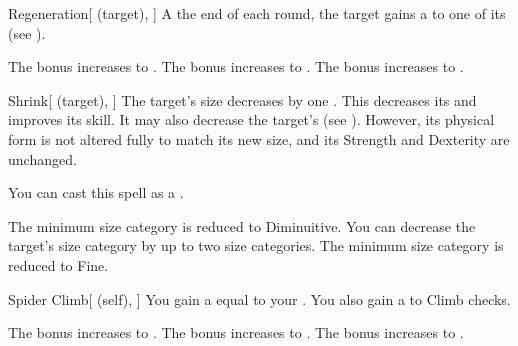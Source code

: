 \lowercase{\hypertarget{spell:Regeneration}{}}\label{spell:Regeneration}
\begin{attuneability}[Rank 1]{\hypertarget{spell:Regeneration}{Regeneration}}[ (target), ]
A the end of each round, the target gains a   to one of its  (see ).

\rankline
{} The bonus increases to .
 The bonus increases to .
 The bonus increases to .
\end{attuneability}
\vspace{0.25em}



\lowercase{\hypertarget{spell:Shrink}{}}\label{spell:Shrink}
\begin{attuneability}[Rank 1]{\hypertarget{spell:Shrink}{Shrink}}[ (target), ]
The target's size decreases by one .
This decreases its  and improves its  skill.
It may also decrease the target's  (see ).
However, its physical form is not altered fully to match its new size, and its Strength and Dexterity are unchanged.

You can cast this spell as a .

\rankline
{} The minimum size category is reduced to Diminuitive.
 You can decrease the target's size category by up to two size categories.
 The minimum size category is reduced to Fine.
\end{attuneability}
\vspace{0.25em}



\lowercase{\hypertarget{spell:Spider Climb}{}}\label{spell:Spider Climb}
\begin{attuneability}[Rank 1]{\hypertarget{spell:Spider Climb}{Spider Climb}}[ (self), ]
You gain a  equal to your .
You also gain a   to Climb checks.

\rankline
{} The bonus increases to .
 The bonus increases to .
 The bonus increases to .
\end{attuneability}
\vspace{0.25em}



